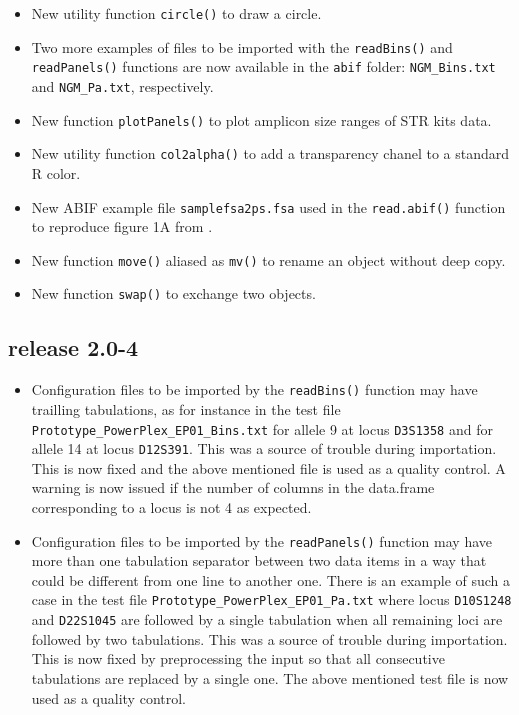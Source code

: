\documentclass{article}
\begin{document}
\begin{itemize}

\item New utility function \texttt{circle()} to draw a circle.

\item Two more examples of files to be imported with the \texttt{readBins()}
and \texttt{readPanels()} functions are now available in the \texttt{abif}
folder: \texttt{NGM\_Bins.txt} and \texttt{NGM\_Pa.txt}, respectively.

\item New function \texttt{plotPanels()} to plot amplicon size ranges of STR kits data.

\item New utility function \texttt{col2alpha()} to add a transparency chanel to a standard R color.

\item New ABIF example file \texttt{samplefsa2ps.fsa} used in the
\texttt{read.abif()} function to reproduce figure 1A from \cite{Krawczyk2009}.

\item New function \texttt{move()} aliased as \texttt{mv()} to rename
an object without deep copy.

\item New function \texttt{swap()} to exchange two objects.

\end{itemize}

\subsection*{release 2.0-4}

\begin{itemize}

\item Configuration files to be imported by the \texttt{readBins()}
function may have trailling tabulations, as for instance in the
test file \texttt{Prototype\_PowerPlex\_EP01\_Bins.txt} for allele
9 at locus \texttt{D3S1358} and for allele 14 at locus \texttt{D12S391}.
This was a source of trouble during importation. This is now fixed
and the above mentioned file is used as a quality control. A warning
is now issued if the number of columns in the data.frame corresponding
to a locus is not 4 as expected.

\item Configuration files to be imported by the \texttt{readPanels()}
function may have more than one tabulation separator between
two data items in a way that could be different from one
line to another one. There is an example of such a case in the
test file \texttt{Prototype\_PowerPlex\_EP01\_Pa.txt} where
locus \texttt{D10S1248} and \texttt{D22S1045} are followed by a
single tabulation when all remaining loci are followed by two
tabulations.
This was a source of trouble during importation.
This is now fixed by preprocessing the input so that
all consecutive tabulations are replaced by a single one.
The above mentioned test file is now used as a quality control.

\end{itemize}
\end{document}
